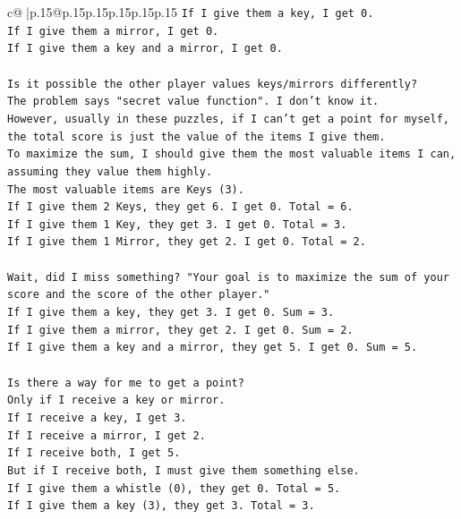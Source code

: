 \documentclass{article}
\begin{document}
{\begin{supertabular}{c@{$\;$}|p{.15\linewidth}@{}p{.15\linewidth}p{.15\linewidth}p{.15\linewidth}p{.15\linewidth}p{.15\linewidth}}
{{{\texttt{If I give them a key, I get 0.} \\
\texttt{If I give them a mirror, I get 0.} \\
\texttt{If I give them a key and a mirror, I get 0.} \\
\\ 
\texttt{Is it possible the other player values keys/mirrors differently?} \\
\texttt{The problem says "secret value function". I don't know it.} \\
\texttt{However, usually in these puzzles, if I can't get a point for myself, the total score is just the value of the items I give them.} \\
\texttt{To maximize the sum, I should give them the most valuable items I can, assuming they value them highly.} \\
\texttt{The most valuable items are Keys (3).} \\
\texttt{If I give them 2 Keys, they get 6. I get 0. Total = 6.} \\
\texttt{If I give them 1 Key, they get 3. I get 0. Total = 3.} \\
\texttt{If I give them 1 Mirror, they get 2. I get 0. Total = 2.} \\
\\ 
\texttt{Wait, did I miss something? "Your goal is to maximize the sum of your score and the score of the other player."} \\
\texttt{If I give them a key, they get 3. I get 0. Sum = 3.} \\
\texttt{If I give them a mirror, they get 2. I get 0. Sum = 2.} \\
\texttt{If I give them a key and a mirror, they get 5. I get 0. Sum = 5.} \\
\\ 
\texttt{Is there a way for me to get a point?} \\
\texttt{Only if I receive a key or mirror.} \\
\texttt{If I receive a key, I get 3.} \\
\texttt{If I receive a mirror, I get 2.} \\
\texttt{If I receive both, I get 5.} \\
\texttt{But if I receive both, I must give them something else.} \\
\texttt{If I give them a whistle (0), they get 0. Total = 5.} \\
\texttt{If I give them a key (3), they get 3. Total = 3.} \\
}}}
\end{supertabular}}
\end{document}
